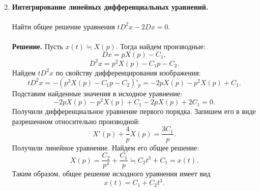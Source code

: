 \documentclass[a4paper, 12pt]{article}
\begin{document}
\begin{enumerate}
\begin{multline*}
		\end{multline*}
		\item \textbf{Интегрирование линейных дифференциальных уравнений.}\\\\
		Найти общее решение уравнения $tD^2x - 2Dx = 0$.\\\\
		\textbf{Решение.} Пусть $x(t) \fallingdotseq X(p)$. Тогда найдем производные:
		$$Dx = pX(p) - C_1,$$
		$$D^2x = p^2X(p) - C_1p - C_2.$$
		Найдем $tD^2x$ по свойству дифференцирования изображения:
		$$tD^2x = - (p^2X(p) - C_1p - C_2)'_p = -2pX(p) - p^2X(p) + C_1.$$
		Подставим найденные значения в исходное уравнение:
		$$-2pX(p) - p^2X(p) + C_1 - 2pX(p) + 2C_1 = 0.$$
		Получили дифференциальное уравнение первого порядка. Запишем его в виде разрешенном относительно производной:
		$$X'(p) + \dfrac{4}{p} X(p) = \dfrac{3C_1}{p}.$$
		Получили линейное уравнение. Найдем его общее решение:
		$$X(p) =\dfrac{C_2}{p^4} + \dfrac{C_1}{p} \fallingdotseq C_2t^3 + C_1 = x(t).$$
		Таким образом, общее решение исходного уравнения имеет вид $$x(t) = C_1 + C_2t^3.$$
	\end{enumerate}
\end{document}
